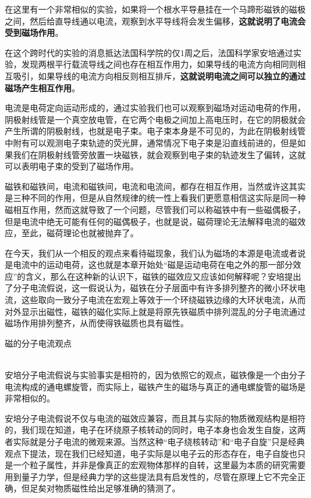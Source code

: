 在这里有一个非常相似的实验，如果将一个根水平导悬挂在一个马蹄形磁铁的磁极之间，然后给直导线通以电流，观察到水平导线将会发生偏移，\textbf{这就说明了电流会受到磁场作用}。

在这个跨时代的实验的消息抵达法国科学院的仅1周之后，法国科学家安培通过实验，发现两根平行载流导线之间也存在相互作用力，如果导线的电流方向相同则相互吸引，如果导线的电流方向相反则相互排斥，\textbf{这就说明电流之间可以独立的通过磁场产生相互作用}。

电流是电荷定向运动形成的，通过实验我们也可以观察到磁场对运动电荷的作用，阴极射线管是一个真空放电管，在它两个电极之间加上高电压时，在它的阴极就会产生所谓的阴极射线，也就是电子束。电子束本身是不可见的，为此在阴极射线管中附有可以观测电子束轨迹的荧光屏，通常情况下电子束是沿直线前进的，但是如果我们在阴极射线管旁放置一块磁铁，就会观察到电子束的轨迹发生了偏转，这就可以表明电子束的受到了磁场作用。

磁铁和磁铁间，电流和磁铁间，电流和电流间，都存在相互作用，当然或许这其实是三种不同的作用，但是从自然规律的统一性上看我们更愿意相信这实际是同一种磁相互作用，然而这就导致了一个问题，尽管我们可以称磁铁中有一些磁偶极子，但是电流中绝无可能有任何的磁偶极子，也就是说，磁荷理论无法解释电流的磁效应，至此，磁荷理论也就被抛弃了。

在今天，我们从一个相反的观点来看待磁现象，我们认为磁场的本源是电流或者说是电流中的运动电荷，这也就是本章开始处“磁是运动电荷在电之外的那一部分效应”的含义，那么在这种新的认识下，磁铁的磁效应又应该如何解释呢？安培提出了分子电流假说，这一假说认为，磁铁在分子层面中有许多排列整齐的微小环状电流，这些取向一致分子电流在宏观上等效于一个环绕磁铁边缘的大环状电流，从而对外显示出磁性，磁铁的磁化实际上就是将原先铁磁质中排列混乱的分子电流通过磁场作用排列整齐，从而使得铁磁质也具有磁性。
\begin{Figure}{磁的分子电流观点}
    \\
    \\
\end{Figure}

安培分子电流假说与实验事实是相符的，因为依照它的观点，磁铁像是一个由分子电流构成的通电螺旋管，而实际上，磁铁产生的磁场与真正的通电螺旋管的磁场是非常相似的。

安培分子电流假说不仅与电流的磁效应兼容，而且其与实际的物质微观结构是相符的，我们现在知道，电子在环绕原子核转动的同时，电子本身也会发生自旋，这两者实际就是分子电流的微观来源。当然这种“电子绕核转动”和“电子自旋”只是经典观点下提法，现在我们已经知道，电子实际是以电子云的形态存在，电子自旋也只是一个粒子属性，并非是像真正的宏观物体那样的自转，这里最为本质的研究需要用到量子力学，但是经典力学的这些提法具有启发性的，尽管在原理上它不完全正确，但足矣对物质磁性给出足够准确的猜测了。

